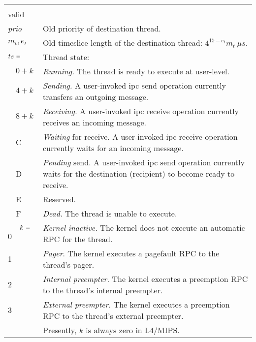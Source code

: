 \documentclass[a4paper,11pt,twoside,dvips]{book}
\makeatletter
\newcommand{\smaller}[1]{{\mathchoice 
           {\raisebox{1pt}{$\scriptstyle #1$}} 
           {\raisebox{1pt}{$\scriptstyle #1$}} 
           {\raisebox{0.5pt}{$\scriptscriptstyle #1$}} 
           {\raisebox{0.5pt}{$\scriptscriptstyle #1$}} 
}}
\newcommand{\EQ}{\smaller{=}}
\newcommand{\undef}{$\sim$}
\newlength{\Up}\setlength{\Up}{-\baselineskip}
\newlength{\Params}
\newenvironment{param}[1] 
{%
\setlength{\Params}{\textwidth}\addtolength{\Params}{-140pt}%
\par\vspace{5pt}%
\noindent\begin{minipage}{\textwidth} 
\noindent {\em #1}\\[\Up]%
\noindent\begin{tabular}{@{\hspace*{75pt}}lp{\Params}}%
\hspace*{30pt}&\\[\Up]%
} 
{%
\end{tabular}\end{minipage}\par\vspace{5pt}%
}
\newlength{\bboxw}
\newcommand{\impnote}[1]{\framebox{\textbf{MIPS Implementation Note:}} #1}
\newcommand{\bbox}[2]{\setlength{\bboxw}{#2pt}\addtolength{\bboxw}{\bboxw}%
\addtolength{\bboxw}{\bboxw}\addtolength{\bboxw}{\bboxw}%
\framebox[\bboxw]{{\footnotesize #1$_{\ (#2)}$\rule[-1ex]{0pt}{4ex}}}}
\makeatother
\begin{document}
\begin{param}{old param word} 
            valid    &     \bbox{$m_t$}{8}\bbox{$e_t$}{4}\bbox{$ts$}{4}%
                           \bbox{\undef}{8}\bbox{prio}{8}\\[12pt] 
% 
         {\em prio}  &     Old priority of destination thread.\\[5pt] 
% 
              $m_t,e_t$&   Old timeslice length of the destination thread:
                           $4^{15-e_t}m_t\ \mu s$.\\[5pt] 
% 
         $ts\ \EQ$   &     Thread state:\\ 
% 
         $\quad 0+k$ &     {\em Running.} The thread is ready to execute
                           at user-level.\\
% 
         $\quad 4+k$ &     {\em Sending.} A user-invoked ipc send operation
                           currently transfers an outgoing message.\\ 
% 
         $\quad 8+k$ &     {\em Receiving.} A user-invoked ipc
                           receive operation
                           currently receives an incoming message.\\ 
% 
         $\quad$C    &     {\em Waiting} for receive. A user-invoked ipc
                           receive operation currently waits for an
                           incoming message.\\
% 
         $\quad$D    &     {\em Pending} send. A user-invoked ipc send
                           operation currently waits for the destination
                           (recipient) to become ready to receive.\\ 
% 
         $\quad$E    &     Reserved.\\ 
% 
         $\quad$F    &     {\em Dead.} The thread is unable to
                           execute.\\[8pt]
% 
% 
  $\quad\ \ k\ \EQ$\hspace*{\fill} 0   &  {\em Kernel inactive.} The kernel
                           does
                           not execute an automatic RPC for the thread.\\
% 
  \hspace*{\fill}1   &     {\em Pager}. The kernel executes a pagefault
                           RPC to the thread's pager.\\
% 
  \hspace*{\fill}2   &     {\em Internal preempter.} The kernel executes a
                           preemption RPC to the thread's internal
                           preempter.\\
% 
  \hspace*{\fill}3   &     {\em External preempter.} The kernel executes a
                           preemption RPC to the thread's external
                           preempter.\\
% 
		     &     \cbstart\impnote{Presently, \(k\) is always zero in L4/MIPS.}\cbend\\[8pt]


\end{param}
\end{document}
